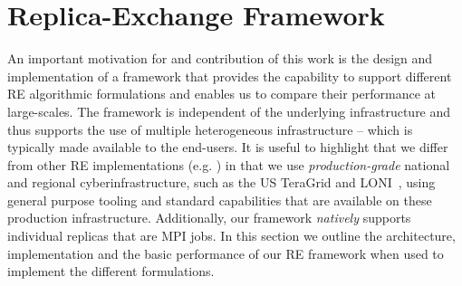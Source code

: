 \documentclass{rspublic}
\newcommand{\jhanote}[1]{ {\textcolor{red} { ***shantenu: #1 }}}
\newcommand{\alnote}[1]{ {\textcolor{blue} { ***andre: #1 }}}
\newcommand{\athotanote}[1]{ {\textcolor{green} { ***athota: #1 }}}
\newcommand{\alnote}[1]{}
\newcommand{\athotanote}[1]{}
\newcommand{\jhanote}[1]{}
\begin{document}



\section{Replica-Exchange Framework}\label{repexfw}

An important motivation for and contribution of this work is the design
and implementation of a framework that provides the capability to
support different RE algorithmic formulations and enables us to compare their
performance at large-scales.
The framework is independent of the underlying infrastructure and thus
supports the use of multiple heterogeneous infrastructure -- which is
typically made available to the end-users.  It is useful to highlight that
we differ from other RE implementations (e.g.  \cite{parashar_arepex})
in that we use {\it production-grade} national and regional
cyberinfrastructure, such as the US TeraGrid and
LONI~\citep{LONI_web}, using general purpose tooling and standard
capabilities that are available on these production infrastructure.
Additionally, our framework {\it natively} supports individual
replicas that are MPI jobs. In this section we outline the
architecture, implementation and the basic performance of our RE
framework when used to implement the different formulations.
\end{document}
